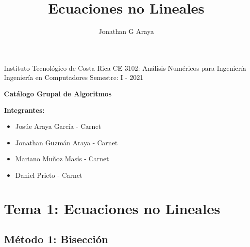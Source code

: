 \documentclass[10pt,a4paper]{article}
\author{Jonathan G Araya}
\title{Ecuaciones no Lineales}
\begin{document}
	Instituto Tecnológico de Costa Rica \hfill CE-3102: Análisis Numéricos para Ingeniería\\
	Ingeniería en Computadores \hfill Semestre: I - 2021\\
	
	
	\begin{center}
		\textbf{\huge Catálogo Grupal de Algoritmos}
	\end{center}

	{\bf Integrantes: }
	\begin{itemize}
		\item Josúe Araya García - Carnet
		\item Jonathan Guzmán Araya - Carnet
		\item Mariano Muñoz Masís - Carnet
		\item Daniel Prieto - Carnet
	\end{itemize}

\section{Tema 1: Ecuaciones no Lineales}

\subsection{Método 1: Bisección}
	
\end{document}
